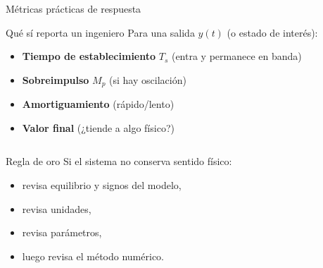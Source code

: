 \documentclass[aspectratio=169,10pt]{beamer}
\newcommand{\importantbox}[2][Importante]{%
\begin{alertblock}{#1}#2\end{alertblock}}
\begin{document}
\begin{frame}{Métricas prácticas de respuesta}
\small

\begin{block}{Qué sí reporta un ingeniero}
Para una salida $y(t)$ (o estado de interés):
\begin{itemize}
\item \textbf{Tiempo de establecimiento} $T_s$ (entra y permanece en banda)
\item \textbf{Sobreimpulso} $M_p$ (si hay oscilación)
\item \textbf{Amortiguamiento} (rápido/lento)
\item \textbf{Valor final} (¿tiende a algo físico?)
\end{itemize}
\end{block}

\begin{columns}[T]
\importantbox[Regla de oro]{
Si el sistema no conserva sentido físico:
\begin{itemize}
\item revisa equilibrio y signos del modelo,
\item revisa unidades,
\item revisa parámetros,
\item luego revisa el método numérico.
\end{itemize}
}

\begin{center}
\end{center}
\end{columns}

\end{frame}
\end{document}
